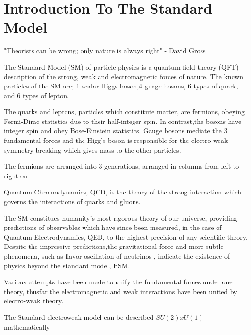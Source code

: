 \section{Introduction To The Standard Model}\label{secSM}



"Theorists can be wrong; only nature is always right" - David Gross\newline



The Standard Model (SM) of particle physics is a quantum field theory (QFT) description of the strong, weak and electromagnetic forces of nature. The known particles of the SM are; 1 scalar Higgs boson,4 guage bosons, 6 types of quark, and 6 types of lepton. 

The quarks and leptons, particles which constitute matter, are fermions, obeying Fermi-Dirac statistics due to their half-integer spin. In contrast,the bosons have integer spin and obey Bose-Einstein statistics. Gauge bosons mediate the 3 fundamental forces and the Higg's boson is responsible for the electro-weak symmetry breaking which gives mass to the other particles\cite{Griffiths:111880}. 

The fermions are arranged into 3 generations, arranged in columns from left to right on \cite{fig:SM}



Quantum Chromodynamics, QCD, is the theory of the strong interaction which governs the interactions of quarks and gluons\cite{Griffiths:111880}.


The SM constitues humanity's most rigorous theory of our universe, providing predictions of observables which have since been measured, in the case of Quantum Electrodynamics, QED, to the highest precision of any scientific theory. Despite the impressive predictions,the gravitational force and more subtle phenomena, such as flavor oscillation of neutrinos \cite{Ashie:2005ik}, indicate the existence of physics beyond the standard model, BSM.

Various attempts have been made to unify the fundamental forces under one theory, thusfar the electromagnetic and weak interactions have been united by electro-weak theory. 

The Standard electroweak model can be described $SU(2) x U(1)$ mathematically.

